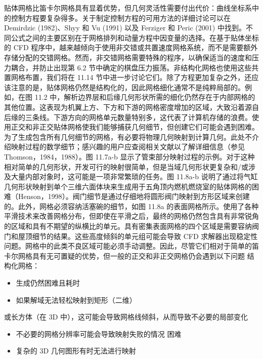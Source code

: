 \documentclass[11pt,a4paper,openany,fontset=none]{ctexbook}
\begin{document}
贴体网格比笛卡尔网格具有显着优势，但几何灵活性需要付出代价：曲线坐标系中的控制方程要复杂得多。关于制定控制方程的可用方法的详细讨论可以在 Demirdzic (1982)、Shyy 和 Vu (1991) 以及 Ferziger 和 Peric (2001) 中找到。不同公式之间的主要区别在于网格排列和动量方程中因变量的选择。在基于贴体坐标的 CFD 程序中，越来越倾向于使用非交错或共置速度网格系统，而不是需要额外存储分配的交错网格。然而，非交错网格需要特殊的程序，以确保适当的速度和压力耦合，并防止出现第 6.2 节中确定的棋盘压力振荡。非结构化网格也使用这些共置网格布置，我们将在 11.14 节中进一步讨论它们。除了方程更加复杂之外，还应该注意的是，贴体网格仍然是结构化的，因此网格细化通常不是纯粹局部的。例如，在图 11.2 中，解析边界层和后缘几何形状所需的细​​化仍然存在于内部网格的其他位置。这表现为机翼上方、下方和下游的网格密度增加的区域，大致沿着源自后缘的三条线。下游方向的网格单元数量特别多，这代表了计算机存储的浪费。使用正交和非正交贴体网格使我们能够捕获几何细节，但创建它们可能会遇到困难。为了生成包含所有几何细节的网格，有必要将物理几何映射到计算几何。此处不介绍映射过程的数学细节；感兴趣的用户应查阅相关文献以了解详细信息（参见 Thomson，1984，1988）。图 11.7a-b 显示了管束部分映射过程的示例。对于这种相对简单的几何形状，开发可行的映射很简单，但是当域几何形状更复杂和/或涉及大量内部对象时，这可能是一项非常繁琐的任务。图 11.8a-b 说明了通过将气缸几何形状映射到单个三维六面体块来生成用于五角顶内燃机燃烧室的贴体网格的困难（Henson，1998）。阀门细节是通过仔细地将圆形阀门映射到方形区域来创建的。此外，网格必须容纳活塞碗的细节，如图 11.8a 的表面网格所示。使用了各种平滑技术来改善网格分布，但即使在平滑之后，最终的网格仍然包含具有非常锐角的区域和具有不期望的纵横比的单元。具有密集表面网格的四个区域是需要容纳阀门和屋顶细节的结果。这些高度倾斜的单元组可能会导致 CFD 求解器出现稳定性问题。网格中的此类不良区域可能必须手动调整。因此，尽管它们相对于简单的笛卡尔网格具有无可置疑的优势，但一般的正交和非正交网格仍会遇到以下问题 结构化网格：

\begin{itemize}

\item 生成仍然困难且耗时

\item 如果解域无法轻松映射到矩形（二维）

\end{itemize}

或长方体（在 3D 中），这可能会导致网格线倾斜，从而导致不必要的局部变化

\begin{itemize}

\item 不必要的网格分辨率可能会导致映射失败的情况 困难

\item 复杂的 3D 几何图形有时无法进行映射

\end{itemize}
\end{document}

